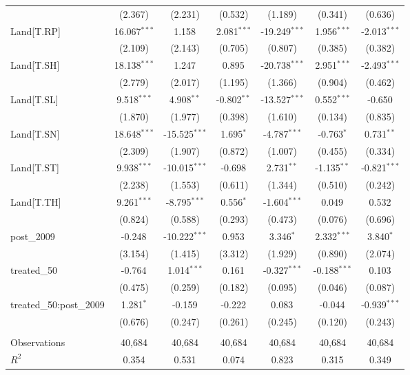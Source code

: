 \begin{table}[!htbp]
\begin{tabular}{@{\extracolsep{5pt}}lcccccc}
  & (2.367) & (2.231) & (0.532) & (1.189) & (0.341) & (0.636) \\
 Land[T.RP] & 16.067$^{***}$ & 1.158$^{}$ & 2.081$^{***}$ & -19.249$^{***}$ & 1.956$^{***}$ & -2.013$^{***}$ \\
  & (2.109) & (2.143) & (0.705) & (0.807) & (0.385) & (0.382) \\
 Land[T.SH] & 18.138$^{***}$ & 1.247$^{}$ & 0.895$^{}$ & -20.738$^{***}$ & 2.951$^{***}$ & -2.493$^{***}$ \\
  & (2.779) & (2.017) & (1.195) & (1.366) & (0.904) & (0.462) \\
 Land[T.SL] & 9.518$^{***}$ & 4.908$^{**}$ & -0.802$^{**}$ & -13.527$^{***}$ & 0.552$^{***}$ & -0.650$^{}$ \\
  & (1.870) & (1.977) & (0.398) & (1.610) & (0.134) & (0.835) \\
 Land[T.SN] & 18.648$^{***}$ & -15.525$^{***}$ & 1.695$^{*}$ & -4.787$^{***}$ & -0.763$^{*}$ & 0.731$^{**}$ \\
  & (2.309) & (1.907) & (0.872) & (1.007) & (0.455) & (0.334) \\
 Land[T.ST] & 9.938$^{***}$ & -10.015$^{***}$ & -0.698$^{}$ & 2.731$^{**}$ & -1.135$^{**}$ & -0.821$^{***}$ \\
  & (2.238) & (1.553) & (0.611) & (1.344) & (0.510) & (0.242) \\
 Land[T.TH] & 9.261$^{***}$ & -8.795$^{***}$ & 0.556$^{*}$ & -1.604$^{***}$ & 0.049$^{}$ & 0.532$^{}$ \\
  & (0.824) & (0.588) & (0.293) & (0.473) & (0.076) & (0.696) \\
 post_2009 & -0.248$^{}$ & -10.222$^{***}$ & 0.953$^{}$ & 3.346$^{*}$ & 2.332$^{***}$ & 3.840$^{*}$ \\
  & (3.154) & (1.415) & (3.312) & (1.929) & (0.890) & (2.074) \\
 treated_50 & -0.764$^{}$ & 1.014$^{***}$ & 0.161$^{}$ & -0.327$^{***}$ & -0.188$^{***}$ & 0.103$^{}$ \\
  & (0.475) & (0.259) & (0.182) & (0.095) & (0.046) & (0.087) \\
 treated_50:post_2009 & 1.281$^{*}$ & -0.159$^{}$ & -0.222$^{}$ & 0.083$^{}$ & -0.044$^{}$ & -0.939$^{***}$ \\
  & (0.676) & (0.247) & (0.261) & (0.245) & (0.120) & (0.243) \\
\hline \\[-1.8ex]
 Observations & 40,684 & 40,684 & 40,684 & 40,684 & 40,684 & 40,684 \\
 $R^2$ & 0.354 & 0.531 & 0.074 & 0.823 & 0.315 & 0.349 \\

\end{tabular}
\end{table}
